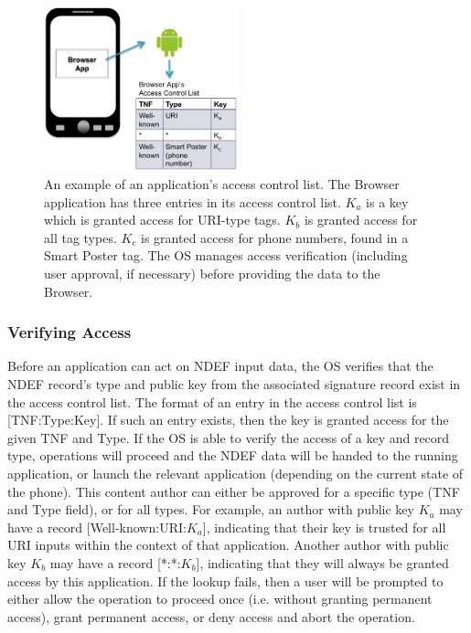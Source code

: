 \documentclass[12pt]{article}
\begin{document}
\begin{figure}[h!]
\begin{minipage}{\textwidth}
	\centering
		\includegraphics[width=0.5\textwidth]{ACL_image.png}
	\caption[Caption for LOF]%
    {An example of an application's access control list. The Browser application has three entries in its access control list. $K_a$ is a key which is granted access for URI-type tags. $K_b$ is granted access for all tag types. $K_c$ is granted access for phone numbers, found in a Smart Poster tag. The OS manages access verification (including user approval, if necessary) before providing the data to the Browser.}
  \label{fig:solution:acl}

\end{minipage} 
\end{figure}
\subsubsection{Verifying Access}
Before an application can act on NDEF input data, the OS verifies that the NDEF record's type and public key from the associated signature record exist in the access control list.
The format of an entry in the access control list is [TNF:Type:Key].
If such an entry exists, then the key is granted access for the given TNF and Type.
If the OS is able to verify the access of a key and record type, operations will proceed and the NDEF data will be handed to the running application, or launch the relevant application (depending on the current state of the phone).
This content author can either be approved for a specific type (TNF and Type field), or for all types.
For example, an author with public key $K_a$ may have a record [Well-known:URI:$K_a$], indicating that their key is trusted for all URI inputs within the context of that application.
Another author with public key $K_b$ may have a record [*:*:$K_b$], indicating that they will always be granted access by this application.
If the lookup fails, then a user will be prompted to either allow the operation to proceed once (i.e. without granting permanent access), grant permanent access, or deny access and abort the operation.
\end{document}
